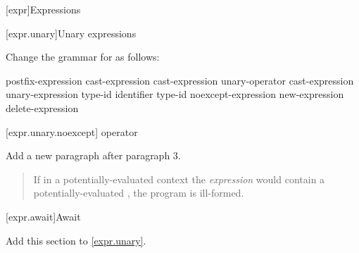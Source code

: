 

\setcounter{chapter}{4}
[expr]{Expressions}

\setcounter{section}{2}
[expr.unary]{Unary expressions}


Change the grammar for  as follows:

\begin{bnf}
	\br
	postfix-expression\br
	\terminal{++} cast-expression\br
	\terminal{-{-}} cast-expression\br
	\br
	unary-operator cast-expression\br
	 unary-expression\br
	 type-id \terminal{)}\br
	 \terminal{(} identifier \terminal{)}\br
	 type-id \terminal{)}\br
	noexcept-expression\br
	new-expression\br
	delete-expression\br
\end{bnf}

\setcounter{subsection}{6}
[expr.unary.noexcept]{ operator}


Add a new paragraph after paragraph 3.

\begin{quote}
\setcounter{Paras}{3}
\pnum
If in a potentially-evaluated context the \textit{expression} would contain a potentially-evaluated , the program is ill-formed.
\end{quote}

\setcounter{subsection}{7}
[expr.await]{Await}

Add this section to \ref{expr.unary}.

